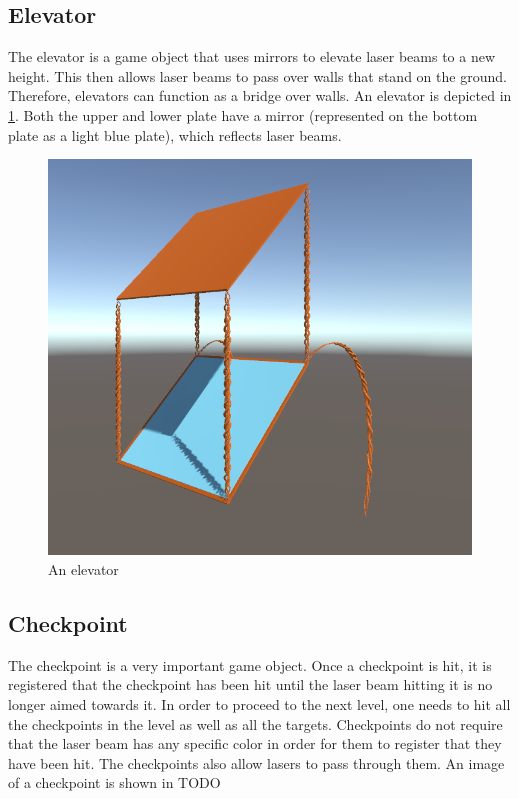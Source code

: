 		\subsection{Elevator} \label{ssec:elevator}
			The elevator is a game object that uses mirrors to elevate laser beams
			to a new height. This then allows laser beams to pass over walls that 
			stand on the ground. Therefore, elevators can function as a bridge over
			walls. An elevator is depicted in \ref{fig:elevator}. Both the upper and 
			lower plate have a mirror (represented on the bottom plate as a light 
			blue plate), which reflects laser beams.
			\begin{figure}[!ht]
				\centering
				\includegraphics[scale = 0.3]{Elevator}
				\caption{An elevator}
				\label{fig:elevator}
			\end{figure}
			
		\subsection{Checkpoint}
			The checkpoint is a very important game object. Once a checkpoint is
			hit, it is registered that the checkpoint has been hit until the
			laser beam hitting it is no longer aimed towards it. In order to
			proceed to the next level, one needs to hit all the checkpoints
			in the level as well as all the targets. Checkpoints do not require
			that the laser beam has any specific color in order for them to register
			that they have been hit. The checkpoints also allow lasers to pass
			through them. An image of a checkpoint is shown in TODO
			
